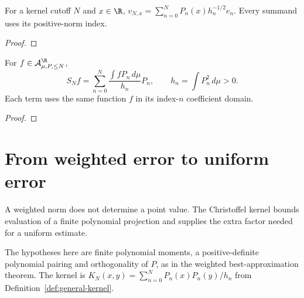\begin{supporting}

\begin{theorem}
\label{thm:kernel-vector-characterisation}
\leanok
For a kernel cutoff $N$ and $x\in\R$,
$v_{N,x}=\sum_{n=0}^N P_n(x)h_n^{-1/2}e_n$.
Every summand uses its positive-norm index.
\end{theorem}
\begin{proof}
\leanok
\end{proof}

\begin{theorem}
\label{thm:weighted-partial-sum-characterisation}
\leanok
For $f\in\mathcal A_{\mu,P,\le N}^{\R}$,
\[
 S_Nf=\sum_{n=0}^N\frac{\int fP_n\,d\mu}{h_n}P_n,
 \qquad h_n=\int P_n^2\,d\mu>0.
\]
Each term uses the same function $f$ in its index-$n$ coefficient domain.
\end{theorem}
\begin{proof}
\leanok
\end{proof}

\end{supporting}

\section{From weighted error to uniform error}\label{sec:textbook-jacobi-approx-uniform}

A weighted norm does not determine a point value. The Christoffel kernel bounds evaluation of a finite polynomial projection and supplies the extra factor needed for a uniform estimate.

The hypotheses here are finite polynomial moments, a positive-definite polynomial pairing and orthogonality of $P$, as in the weighted best-approximation theorem. The kernel is $K_N(x,y)=\sum_{n=0}^N P_n(x)P_n(y)/h_n$ from Definition~\ref{def:general-kernel}.

